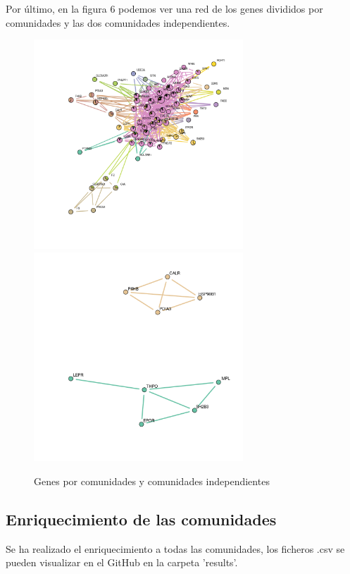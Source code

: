 Por último, en la figura 6 podemos ver una red de los genes divididos por comunidades y las dos comunidades independientes.

\begin{figure}[h]
	\centering
	\includegraphics[width=0.70\textwidth]{figures/01_NetworkComunidades.png}
	\includegraphics[width=0.70\textwidth]{figures/05_Comunidades_Independientes.png}
	\caption{Genes por comunidades y comunidades independientes}
	\label{fig: Figura 6}
\end{figure}

\subsection{Enriquecimiento de las comunidades}
Se ha realizado el enriquecimiento a todas las comunidades, los ficheros .csv se pueden visualizar en el GitHub en la carpeta 'results'.

